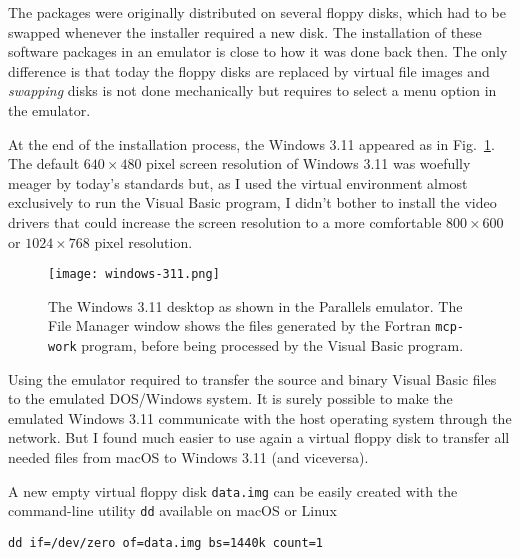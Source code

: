 The packages were originally distributed on several floppy disks, which had to be swapped whenever the installer required a new disk. 
The installation of these software packages in an emulator is close to how it was done back then.
The only difference is that today the floppy disks are replaced by virtual file images and \emph{swapping} disks is not done mechanically but requires to select a menu option in the emulator.

At the end of the installation process, the Windows 3.11 appeared as in Fig.~\ref{fig:windows-311}.
The default $640 \times 480$ pixel screen resolution of Windows 3.11 was woefully meager by today's standards but, as I used the virtual environment almost exclusively to run the Visual Basic program, I didn't bother to install the video drivers that could increase the screen resolution to a more comfortable $800 \times 600$ or $1024 \times 768$ pixel resolution.

\begin{figure}[t]
	\centering
	\texttt{[image: windows-311.png]}
	\caption{The Windows 3.11 desktop as shown in the Parallels emulator. The File Manager window shows the files generated by the Fortran \texttt{mcp-work} program, before being processed by the Visual Basic program.}
	\label{fig:windows-311}
\end{figure}


Using the emulator required to transfer the source and binary Visual Basic files to the emulated DOS/Windows system.
It is surely possible to make the emulated Windows 3.11 communicate with the host operating system through the network. But I found much easier to use again a virtual floppy disk to transfer all needed files from macOS to Windows 3.11 (and viceversa).

A new empty virtual floppy disk \texttt{data.img} can be easily created with the command-line utility \texttt{dd} available on macOS or Linux

\begin{lstlisting}
dd if=/dev/zero of=data.img bs=1440k count=1
\end{lstlisting}



